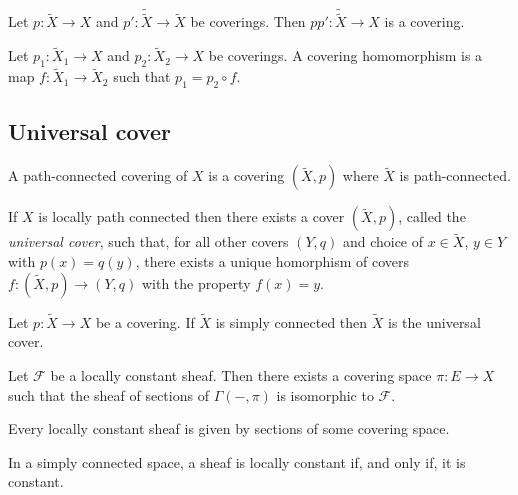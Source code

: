 \documentclass{article}
\begin{document}
\begin{proposition}
  Let $p:\tilde X\to X$ and $p':\tilde{\tilde X}\to\tilde X$ be coverings.
  Then $pp':\tilde{\tilde{X}}\to X$ is a covering.
\end{proposition}

\begin{definition}
  Let $p_1:\tilde X_1\to X$ and $p_2:\tilde X_2\to X$ be coverings. A covering homomorphism
  is a map $f:\tilde X_1\to\tilde X_2$ such that $p_1 = p_2\circ f$.
\end{definition}

\subsection{Universal cover}

\begin{definition}
  A path-connected covering of $X$ is a covering $(\tilde X,p)$ where $\tilde X$ is
  path-connected.
\end{definition}

\begin{theorem}
  If $X$ is locally path connected then there exists a cover $(\tilde X,p)$, called the \emph{universal cover}, 
  such that, for all other covers $(Y,q)$ and choice of $x\in \tilde X$, $y\in Y$
  with $p(x) = q(y)$, there exists a unique homorphism of covers $f:(\tilde X,p)\to(Y,q)$
  with the property $f(x) = y$.
\end{theorem}

\begin{theorem}
  Let $p:\tilde X\to X$ be a covering. If $\tilde X$ is simply connected then
  $\tilde X$ is the universal cover.
\end{theorem}

\begin{theorem}
  Let $\mathscr F$ be a locally constant sheaf. Then there exists a covering
  space $\pi:E\to X$ such that the sheaf of sections of $\Gamma(-, \pi)$ is isomorphic to $\mathscr F$.
\end{theorem}

\begin{theorem}
  Every locally constant sheaf is given by sections of some covering space.
\end{theorem}

\begin{theorem}
  In a simply connected space, a sheaf is locally constant if, and only if,
  it is constant.
\end{theorem}
\end{document}

